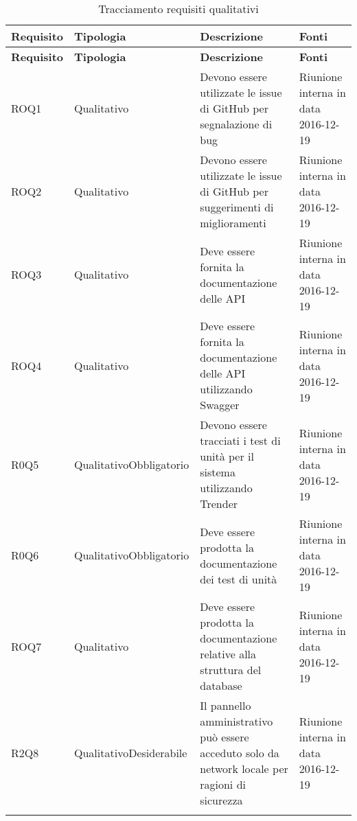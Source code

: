 \documentclass[../AnalisiDeiRequisiti.tex]{subfiles}
\begin{document}
	\begin{longtable}{p{2.5cm}!{\VRule[1pt]}p{2.5cm}!{\VRule[1pt]}p{5cm}!{\VRule[1pt]}p{2.5cm}}
	\color{white} \textbf{Requisito} & \color{white} \textbf{Tipologia} & \color{white} \textbf{Descrizione} & \color{white} \textbf{Fonti} \\ 
	\endfirsthead 
	\color{white} \textbf{Requisito} & \color{white} \textbf{Tipologia} & \color{white} \textbf{Descrizione} & \color{white} \textbf{Fonti} \\ 
	\endhead 
	ROQ1&Qualitativo\newline  & Devono essere utilizzate le issue di GitHub per segnalazione di bug & Riunione interna in data 2016-12-19 \\
	ROQ2&Qualitativo\newline  & Devono essere utilizzate le issue di GitHub per suggerimenti di miglioramenti & Riunione interna in data 2016-12-19 \\
	ROQ3&Qualitativo\newline  & Deve essere fornita la documentazione delle API & Riunione interna in data 2016-12-19 \\
	ROQ4&Qualitativo\newline  & Deve essere fornita la documentazione delle API utilizzando Swagger & Riunione interna in data 2016-12-19 \\
	R0Q5&Qualitativo\newline Obbligatorio & Devono essere tracciati i test di unità per il sistema utilizzando Trender & Riunione interna in data 2016-12-19 \\
	R0Q6&Qualitativo\newline Obbligatorio & Deve essere prodotta la documentazione dei test di unità & Riunione interna in data 2016-12-19 \\
	ROQ7&Qualitativo\newline  & Deve essere prodotta la documentazione relative alla struttura del database & Riunione interna in data 2016-12-19 \\
	R2Q8&Qualitativo\newline Desiderabile & Il pannello amministrativo può essere acceduto solo da network locale per ragioni di sicurezza & Riunione interna in data 2016-12-19 \\
	\caption{Tracciamento requisiti qualitativi}
	\end{longtable}

	\newpage
\end{document}
